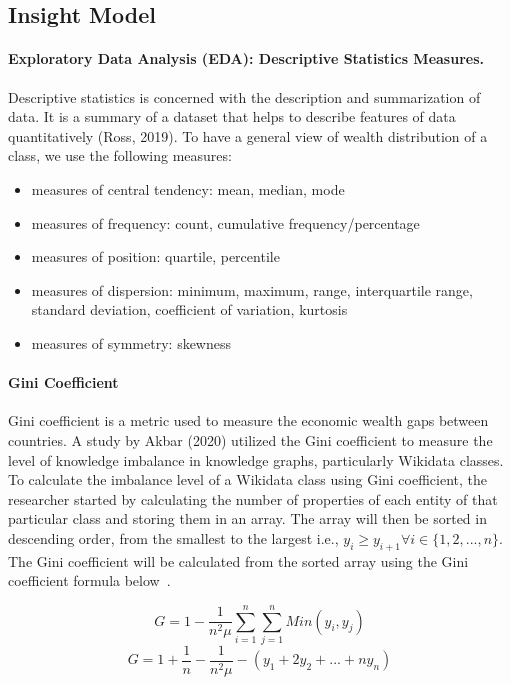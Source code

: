 \subsection{Insight Model} \label{insight-model}

\paragraph{Exploratory Data Analysis (EDA): Descriptive Statistics Measures.} Descriptive statistics is concerned with the description and summarization of data. It is a summary of a dataset that helps to describe features of data quantitatively (Ross, 2019). To have a general view of wealth distribution of a class, we use the following measures:
\begin{itemize}
  \item measures of central tendency: mean, median, mode
  \item measures of frequency: count, cumulative frequency/percentage
  \item measures of position: quartile, percentile
  \item measures of dispersion: minimum, maximum, range, interquartile range, standard deviation, coefficient of variation, kurtosis
  \item measures of symmetry: skewness
\end{itemize}


\paragraph{Gini Coefficient}
Gini coefficient is a metric used to measure the economic wealth gaps between countries. A study by Akbar (2020) utilized the Gini coefficient to measure the level of knowledge imbalance in knowledge graphs, particularly Wikidata classes. To calculate the imbalance level of a Wikidata class using Gini coefficient, the researcher started by calculating the number of properties of each entity of that particular class and storing them in an array. The array will then be sorted in descending order, from the smallest to the largest i.e., \(y_{i} \geq y_{i+1} \forall i \in \{1, 2, ..., n\}\). The Gini coefficient will be calculated from the sorted array using the Gini coefficient formula below~\cite{FosterS1997}.

\[G = 1 - \frac{1}{n^{2}\mu} \sum_{i=1}^{n} \sum_{j=1}^{n} Min(y_{i}, y_{j})\]
\[G = 1 + \frac{1}{n} - \frac{1}{n^{2}\mu} - (y_{1} + 2y_{2} + ... + ny_{n})\]

